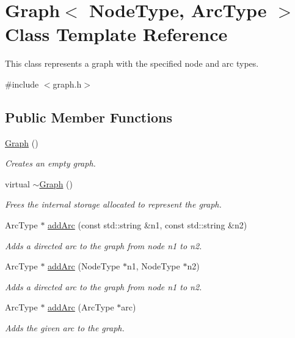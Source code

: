 \hypertarget{classGraph}{}\section{Graph$<$ Node\+Type, Arc\+Type $>$ Class Template Reference}
\label{classGraph}


This class represents a graph with the specified node and arc types.  




{\ttfamily \#include $<$graph.\+h$>$}

\subsection*{Public Member Functions}
\begin{DoxyCompactItemize}
\item 
\mbox{\hyperlink{classGraph_afc5ef9d72cc2c509814200791eaef62c}{Graph}} ()
\begin{DoxyCompactList}\small\item\em Creates an empty graph. \end{DoxyCompactList}\item 
virtual \mbox{\hyperlink{classGraph_af5a604e5e9e4d68dbc10b312e59f678f}{$\sim$\+Graph}} ()
\begin{DoxyCompactList}\small\item\em Frees the internal storage allocated to represent the graph. \end{DoxyCompactList}\item 
Arc\+Type $\ast$ \mbox{\hyperlink{classGraph_aad2e9fedd7110ae2fb6873c5e2d29941}{add\+Arc}} (const std\+::string \&n1, const std\+::string \&n2)
\begin{DoxyCompactList}\small\item\em Adds a directed arc to the graph from node n1 to n2. \end{DoxyCompactList}\item 
Arc\+Type $\ast$ \mbox{\hyperlink{classGraph_a7280d3cd76bab82df392ba91ed5257c6}{add\+Arc}} (Node\+Type $\ast$n1, Node\+Type $\ast$n2)
\begin{DoxyCompactList}\small\item\em Adds a directed arc to the graph from node n1 to n2. \end{DoxyCompactList}\item 
Arc\+Type $\ast$ \mbox{\hyperlink{classGraph_aa1b6553e579c03260253a2d731668dfa}{add\+Arc}} (Arc\+Type $\ast$arc)
\begin{DoxyCompactList}\small\item\em Adds the given arc to the graph. \end{DoxyCompactList}\item 

\end{DoxyCompactItemize}
